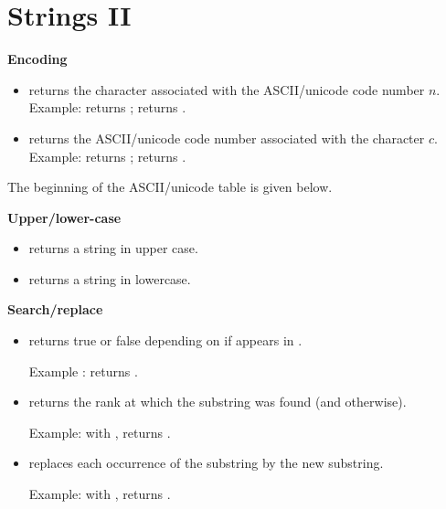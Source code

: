 \documentclass[11pt,class=report,crop=false]{standalone}
\begin{document}
\section{Strings II}



\textbf{Encoding}

\begin{itemize}
  \item {} \quad returns the character associated with the ASCII/unicode code number $n$. Example:  returns ;  returns .
    
  \item {} \quad returns the ASCII/unicode code number associated with the character $c$. Example:  returns ;  returns .
\end{itemize}

The beginning of the ASCII/unicode table is given below.


\bigskip

\textbf{Upper/lower-case}

\begin{itemize}
  \item {} returns a string in upper case.
  \item {} returns a string in lowercase.  
\end{itemize}

\bigskip

\textbf{Search/replace}

\begin{itemize}
  \item {} \quad returns \og{}true\fg{} or \og{}false\fg{} depending on if  appears in .
  
   Example :
 returns .

  \item {} \quad returns the rank at which the substring was found (and  otherwise).
  
  Example: with ,  returns .
  
   \item {} \quad replaces 
   each occurrence of the substring by the new substring.
   
   Example: with ,  returns
   .

\end{itemize}
\end{document}
